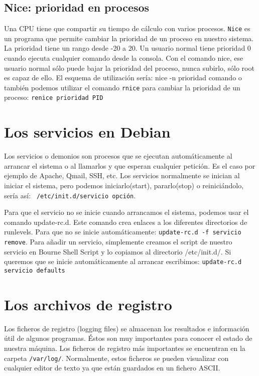 \subsection{{\bf Nice}: prioridad en procesos}
Una CPU tiene que compartir su  tiempo de cálculo con varios procesos.
{\tt  Nice} es  un programa  que permite  cambiar la  prioridad de  un
proceso en  nuestro sistema. La prioridad  tiene un rango desde  -20 a
20.  Un usuario  normal  tiene prioridad  0  cuando ejecuta  cualquier
comando desde la consola. Con el comando nice, ese usuario normal sólo
puede  bajar la  prioridad del  proceso, nunca  subirlo, sólo  root es
capaz de  ello. El  esquema de utilización  sería: {nice  -n prioridad
comando}  o  también podemos  utilizar  el  comando {\tt  rnice}  para
cambiar la prioridad de un proceso: {\tt renice prioridad PID}

\section{Los servicios en Debian}
Los servicios o demonios son  procesos que se ejecutan automáticamente
al  arrancar  el  sistema  o  al llamarlos  y  que  esperan  cualquier
petición.  Es el  caso por  ejemplo de  Apache, Qmail,  SSH, etc.  Los
servicios normalmente se  inician al iniciar el  sistema, pero podemos
iniciarlo(start),  pararlo(stop)  o  reiniciándolo,  sería  así:  {\tt
/etc/init.d/servicio opción}.

Para  que el  servicio  no  se inicie  cuando  arrancamos el  sistema,
podemos  usar el  comando  update-rc.d. Este  comando  crea enlaces  a
los  diferentes  directorios  de  runlevels. Para  que  no  se  inicie
automáticamente: {\tt update-rc.d -f  servicio remove}. Para añadir un
servicio, simplemente creamos el script  de nuestro servicio en Bourne
Shell Script y lo copiamos al directorio /etc/init.d/. Si queremos que
se  inicie automáticamente  al arrancar  escribimos: {\tt  update-rc.d
servicio defaults}

\section{Los archivos de registro}
Los ficheros de registro (logging files) se almacenan los resultados e
información útil de algunos programas.  Éstos son muy importantes para
conocer el  estado de  nuestra máquina. Los  ficheros de  registro más
importantes se encuentran en  la carpeta {\tt /var/log/}. Normalmente,
estos ficheros se  pueden visualizar con cualquier editor  de texto ya
que están guardados en un fichero ASCII.

